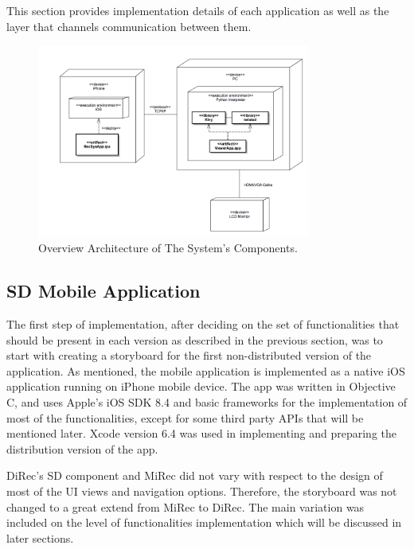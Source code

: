 This section provides implementation details of each application as well as the layer that channels communication between them.    
\begin{figure}[h]
\includegraphics[width=0.8\textwidth, center, center]{figures/deployment}
\caption{Overview Architecture of The System's Components.}
\label{fig:figure41}
\end{figure}

\subsection{SD Mobile Application}
The first step of implementation, after deciding on the set of functionalities that should be present in each version as described in the previous section, was to start with creating a storyboard for the first non-distributed version of the application. As mentioned, the mobile application is implemented as a native iOS application running on iPhone mobile device. The app was written in Objective C, and uses Apple's iOS SDK 8.4 and basic frameworks for the implementation of most of the functionalities, except for some third party APIs that will be mentioned later. Xcode version 6.4 was used in implementing and preparing the distribution version of the app.\par
DiRec's SD component and MiRec did not vary with respect to the design of most
of the UI views and navigation options. Therefore, the
storyboard was not changed to a great extend from MiRec to DiRec. The main
variation was included on the level of functionalities implementation which will
be discussed in later sections.
  
